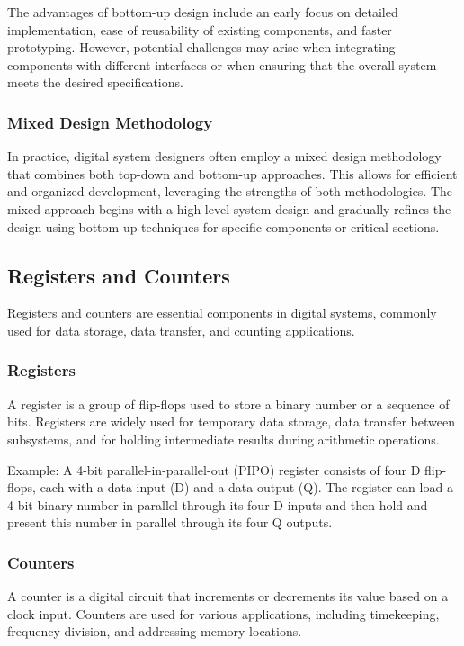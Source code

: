 \documentclass{article}
\begin{document}
The advantages of bottom-up design include an early focus on detailed implementation, ease of reusability of existing components, and faster prototyping. However, potential challenges may arise when integrating components with different interfaces or when ensuring that the overall system meets the desired specifications.

\subsubsection{Mixed Design Methodology}

In practice, digital system designers often employ a mixed design methodology that combines both top-down and bottom-up approaches. This allows for efficient and organized development, leveraging the strengths of both methodologies. The mixed approach begins with a high-level system design and gradually refines the design using bottom-up techniques for specific components or critical sections.

\subsection{Registers and Counters}

Registers and counters are essential components in digital systems, commonly used for data storage, data transfer, and counting applications.

\subsubsection{Registers}

A register is a group of flip-flops used to store a binary number or a sequence of bits. Registers are widely used for temporary data storage, data transfer between subsystems, and for holding intermediate results during arithmetic operations.

Example: A 4-bit parallel-in-parallel-out (PIPO) register consists of four D flip-flops, each with a data input (D) and a data output (Q). The register can load a 4-bit binary number in parallel through its four D inputs and then hold and present this number in parallel through its four Q outputs.

\subsubsection{Counters}

A counter is a digital circuit that increments or decrements its value based on a clock input. Counters are used for various applications, including timekeeping, frequency division, and addressing memory locations.
\end{document}
